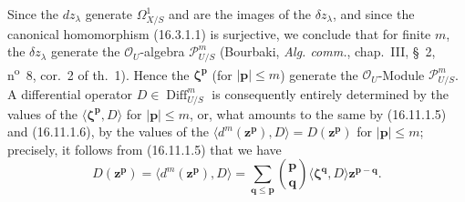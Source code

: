\begin{env}[16.11.1]
Since the $dz_\lambda$ generate $\varOmega_{X/S}^1$ and are the images of the
$\delta z_\lambda$, and since the canonical homomorphism (16.3.1.1) is
surjective, we conclude that for finite $m$, the $\delta z_\lambda$ generate
the $\mathcal{O}_U$-algebra $\mathscr{P}_{U/S}^m$ (Bourbaki,
\emph{Alg. comm.}, chap.~III, §~2, n\textsuperscript{o}~8, cor.~2 of th.~1).
Hence the $\boldsymbol{\zeta}^{\mathbf{p}}$ (for $|\mathbf{p}|\leq m$)
generate the $\mathcal{O}_U$-Module $\mathscr{P}_{U/S}^m$. A differential
operator $D\in\operatorname{Diff}_{U/S}^m$ is consequently entirely
determined by the values of the
$\langle\boldsymbol{\zeta}^{\mathbf{p}},D\rangle$ for
$|\mathbf{p}|\leq m$, or, what amounts to the same by (16.11.1.5) and
(16.11.1.6), by the values
of the $\langle d^m(\mathbf{z}^{\mathbf{p}}),D\rangle=D(\mathbf{z}^{\mathbf{p}})$
for $|\mathbf{p}|\leq m$; precisely, it follows from (16.11.1.5) that
we have
\[
  D(\mathbf{z}^{\mathbf{p}})
  =\langle d^m(\mathbf{z}^{\mathbf{p}}),D\rangle
  =\sum_{\mathbf{q}\leq\mathbf{p}}
    \binom{\mathbf{p}}{\mathbf{q}}
    \langle\boldsymbol{\zeta}^{\mathbf{q}},D\rangle
    \mathbf{z}^{\mathbf{p}-\mathbf{q}}.
  \tag{16.11.1.7}
  \label{IV.16.11.1.7}
\]
\end{env}


